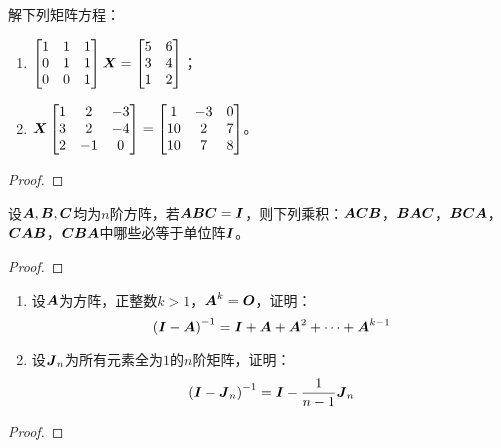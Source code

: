 \begin{problem}
解下列矩阵方程：
\begin{enumerate}
    \item \(\begin{bmatrix}1&1&1\\0&1&1\\0&0&1\end{bmatrix}\boldsymbol{X}=\begin{bmatrix}5&6\\3&4\\1&2\end{bmatrix}\)；
    \item \(\boldsymbol{X}\begin{bmatrix}
              1 & 2  & -3 \\
              3 & 2  & -4 \\
              2 & -1 & 0
          \end{bmatrix}=\begin{bmatrix}
              1  & -3 & 0 \\
              10 & 2  & 7 \\
              10 & 7  & 8
          \end{bmatrix}\)。
\end{enumerate}
\end{problem}
\begin{proof}

\end{proof}

\begin{problem}
设\(\boldsymbol{A},\boldsymbol{B},\boldsymbol{C}\)均为\(n\)阶方阵，若\(\boldsymbol{A}\boldsymbol{B}\boldsymbol{C}=\boldsymbol{I}\)，则下列乘积：\(\boldsymbol{A}\boldsymbol{C}\boldsymbol{B}\)，\(\boldsymbol{B}\boldsymbol{A}\boldsymbol{C}\)，\(\boldsymbol{B}\boldsymbol{C}\boldsymbol{A}\)，\(\boldsymbol{C}\boldsymbol{A}\boldsymbol{B}\)，\(\boldsymbol{C}\boldsymbol{B}\boldsymbol{A}\)中哪些必等于单位阵\(\boldsymbol{I}\)。
\end{problem}
\begin{proof}

\end{proof}

\begin{problem}
\begin{enumerate}
    \item 设\(\boldsymbol{A}\)为方阵，正整数\(k>1\)，\(\boldsymbol{A}^k=\boldsymbol{O}\)，证明：
          \begin{equation*}
              {\left( \boldsymbol{I}-\boldsymbol{A}\right)}^{-1}=\boldsymbol{I}+\boldsymbol{A}+\boldsymbol{A}^2+\cdots+\boldsymbol{A}^{k-1}
          \end{equation*}
    \item 设\(\boldsymbol{J}_n\)为所有元素全为\(1\)的\(n\)阶矩阵，证明：
          \begin{equation*}
              {\left( \boldsymbol{I}-\boldsymbol{J}_n \right)}^{-1}=\boldsymbol{I}-\frac{1}{n-1}\boldsymbol{J}_n
          \end{equation*}
\end{enumerate}
\end{problem}
\begin{proof}

\end{proof}

